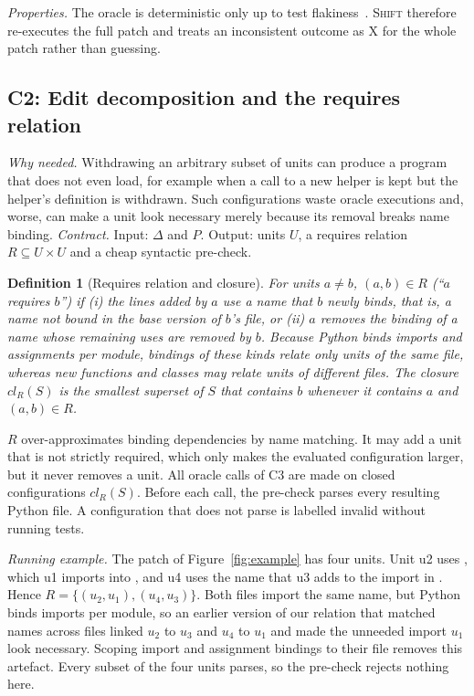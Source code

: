 \documentclass[a4paper,fleqn]{cas-sc}
\newcommand{\tool}{\textsc{Shift}}
\newcommand{\code}[1]{\texttt{\detokenize{#1}}}
\newcommand{\lab}[1]{\textsf{#1}}
\newtheorem{definition}{Definition}
\begin{document}
\emph{Properties.} The oracle is deterministic only up to test flakiness~\citep{luo2014flaky}. \tool{} therefore re-executes the full patch and treats an inconsistent outcome as \lab{X} for the whole patch rather than guessing.

\subsection{C2: Edit decomposition and the requires relation}\label{sec:decomp}
\emph{Why needed.} Withdrawing an arbitrary subset of units can produce a program that does not even load, for example when a call to a new helper is kept but the helper's definition is withdrawn. Such configurations waste oracle executions and, worse, can make a unit look necessary merely because its removal breaks name binding. \emph{Contract.} Input: $\Delta$ and $P$. Output: units $U$, a requires relation $R\subseteq U\times U$ and a cheap syntactic pre-check.

\begin{definition}[Requires relation and closure]\label{def:requires}
For units $a\neq b$, $(a,b)\in R$ (``$a$ requires $b$'') if (i) the lines added by $a$ use a name that $b$ newly binds, that is, a name not bound in the base version of $b$'s file, or (ii) $a$ removes the binding of a name whose remaining uses are removed by $b$. Because Python binds imports and assignments per module, bindings of these kinds relate only units of the same file, whereas new functions and classes may relate units of different files. The closure $\mathit{cl}_R(S)$ is the smallest superset of $S$ that contains $b$ whenever it contains $a$ and $(a,b)\in R$.
\end{definition}

$R$ over-approximates binding dependencies by name matching. It may add a unit that is not strictly required, which only makes the evaluated configuration larger, but it never removes a unit. All oracle calls of C3 are made on closed configurations $\mathit{cl}_R(S)$. Before each call, the pre-check parses every resulting Python file. A configuration that does not parse is labelled \lab{invalid} without running tests.

\emph{Running example.} The patch of Figure~\ref{fig:example} has four units. Unit u2 uses \code{LazyObject}, which u1 imports into \code{operations.py}, and u4 uses the name that u3 adds to the import in \code{fields/__init__.py}. Hence $R=\{(u_2,u_1),(u_4,u_3)\}$. Both files import the same name, but Python binds imports per module, so an earlier version of our relation that matched names across files linked $u_2$ to $u_3$ and $u_4$ to $u_1$ and made the unneeded import $u_1$ look necessary. Scoping import and assignment bindings to their file removes this artefact. Every subset of the four units parses, so the pre-check rejects nothing here.
\end{document}
